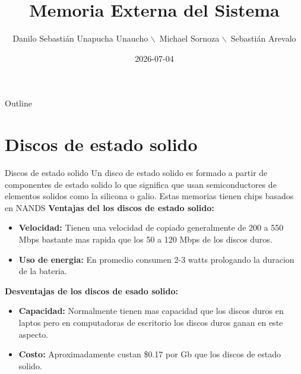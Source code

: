 \documentclass[presentation]{beamer}
\author{Danilo Sebastián Unapucha Unaucho $\backslash$\ Michael Sornoza $\backslash$\ Sebastián Arevalo}
\date{2026-07-04}
\title{Memoria Externa del Sistema}
\begin{document}
\maketitle
\begin{frame}{Outline}
\tableofcontents
\end{frame}

\section{Discos de estado solido}
\label{sec:orgdc8736b}
\begin{frame}[label={sec:org8a88ed2}]{Discos de estado solido}
Un disco de estado solido es formado a partir de componentes de estado
solido lo que significa que usan semiconductores de elementos solidos
como la silicona o galio. Estas memorias tienen chips basados en NANDS
\textbf{Ventajas del los discos de estado solido:}
\begin{itemize}
\item \textbf{Velocidad:} Tienen una velocidad de copiado generalmente de
200 a 550 Mbps bastante mas rapida que los 50 a 120 Mbps de los
discos duros.
\item \textbf{Uso de energia:} En promedio consumen 2-3 watts prologando
la duracion de la bateria.
\end{itemize}
\textbf{Desventajas de los discos de esado solido:}
\begin{itemize}
\item \textbf{Capacidad:} Normalmente tienen mas capacidad que los discos
duros en laptos pero en computadoras de escritorio los discos duros
ganan en este aspecto.
\item \textbf{Costo:} Aproximadamente custan \$0.17 por Gb que los discos
de estado solido.
\end{itemize}
\end{frame}
\end{document}
